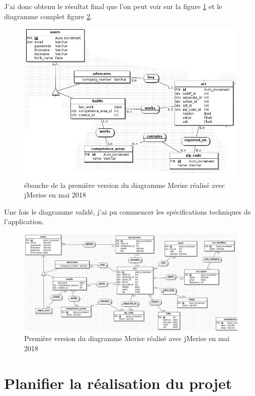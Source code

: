 \documentclass[]{report}
\begin{document}
      J'ai donc obtenu le résultat final que l'on peut voir sur la figure \ref{merise_zoom} et le diagramme complet figure \ref{merise}.

      \begin{figure}[h!]
        \includegraphics[width=\linewidth]{img/merise_zoom.png}
        \caption{ébauche de la première version du diagramme Merise réalisé avec jMerise en mai 2018}
        \label{merise_zoom}
      \end{figure}

      Une fois le diagramme validé, j'ai pu commencer les spécifications techniques de l'application.

      \begin{figure}[h!]
        \includegraphics[width=\linewidth]{img/merise.png}
        \caption{Première version du diagramme Merise réalisé avec jMerise en mai 2018}
        \label{merise}
      \end{figure}

\chapter{Planifier la réalisation du projet}
\end{document}
